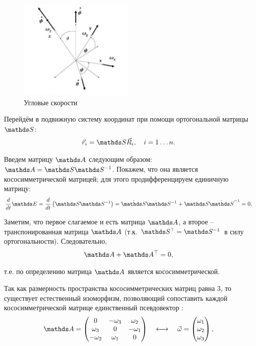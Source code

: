 \begin{figure}
  \centering
	\includegraphics[width=0.5\textwidth]{../pictures/AngularVelocities.jpg}
	\caption{Угловые скорости}
	\label{fig:AngularVelocities}
\end{figure}

Перейдём в подвижную систему координат при помощи ортогональной матрицы $\bbS$:
\vverh
\begin{gather}
\vec{r}_i = \bbS \vec{R}_i, \quad i = 1 \dots n. \notag
\end{gather}

Введем матрицу $\bbA$ следующим образом: $\bbA = \dot{\bbS} \bbS^{-1}$. Покажем, что она является кососимметрической матрицей; для этого продифференцируем единичную матрицу:
\vverh
\begin{gather}
\frac{d}{dt} \bbE = \frac{d}{dt} \left( \bbS \bbS^{-1}\right) = \dot{\bbS} \bbS^{-1} + \bbS \dot{\bbS}^{-1} = 0. \notag
\end{gather}

Заметим, что первое слагаемое и есть матрица $\bbA$, а второе -- транспонированная матрица $\bbA$ (т.к. $\bbS^\top = \bbS^{-1}$ в силу ортогональности). Следовательно,
\vverh
\begin{gather}
\bbA + \bbA^\top = 0, \notag
\end{gather}

\hspace*{-0.75cm} т.е. по определению матрица $\bbA$ является кососимметрической.

Так как размерность пространства кососимметрических матриц равна 3, то существует естественный изоморфизм, позволяющий сопоставить каждой кососимметрической матрице единственный псевдовектор \cite{goldstein}:
\vverh
\begin{gather}
\bbA = 
\begin{pmatrix}
0 & -\omega_3 & \omega_2 \\
\omega_3 & 0 & -\omega_1 \\
-\omega_2 & \omega_1 & 0
\end{pmatrix}
\quad
\longleftrightarrow
\quad
\vec{\omega} = 
\begin{pmatrix}
\omega_1 \\
\omega_2 \\
\omega_3
\end{pmatrix}
,
\notag
\end{gather}


